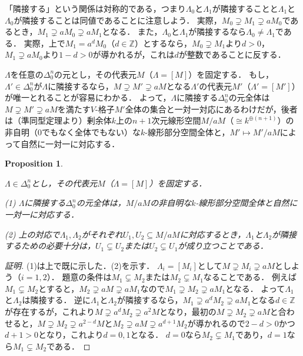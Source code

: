 \documentclass[a4paper,12pt, dvipdfmx]{jsbook}
\def\Z{\mathbb{Z}}
\theoremstyle{plain}
\newtheorem{prop}[thm]{\bfseries Proposition}
\theoremstyle{definition}
\begin{document}
「隣接する」という関係は対称的である，つまり$\Lambda_0$と$\Lambda_1$が隣接することと$\Lambda_1$と$\Lambda_0$が隣接することは同値であることに注意しよう．
実際，$M_0\supsetneq M_1\supsetneq aM_0$であるとき，$M_1\supsetneq aM_0\supsetneq aM_1$となる．
また，$\Lambda_0$と$\Lambda_1$が隣接するなら$\Lambda_0\neq\Lambda_1$である．
実際，上で$M_1=a^dM_0$（$d\in\Z$）とするなら，$M_0\supsetneq M_1$より$d>0$，$M_1\supsetneq aM_0$より$1-d>0$が導かれるが，これは$d$が整数であることに反する．

$\Lambda$を任意の$\Delta^n_0$の元とし，その代表元$M$（$\Lambda=[M]$）を固定する．
もし，$\Lambda'\in\Delta^n_0$が$\Lambda$に隣接するなら，$M\supsetneq M'\supsetneq aM$となる$\Lambda'$の代表元$M'$（$\Lambda'=[M']$）が唯一とれることが容易にわかる．
よって，$\Lambda$に隣接する$\Delta^n_0$の元全体は$M\supsetneq M'\supsetneq aM$を満たす$V$-格子$M'$全体の集合と一対一対応にあるわけだが，後者は（準同型定理より）剰余体$k$上の$n+1$次元線形空間$M/aM$（$\cong k^{\oplus (n+1)}$）の非自明（$0$でもなく全体でもない）な$k$-線形部分空間全体と，$M'\mapsto M'/aM$によって自然に一対一に対応する．
\begin{prop}\label{prop-adjacent}{\rm 
$\Lambda\in\Delta^n_0$とし，その代表元$M$（$\Lambda=[M]$）を固定する．

(1) $\Lambda$に隣接する$\Delta^n_0$の元全体は，$M/aM$の非自明な$k$-線形部分空間全体と自然に一対一に対応する．

(2) 上の対応で$\Lambda_1,\Lambda_2$がそれぞれ$U_1,U_2\subseteq M/aM$に対応するとき，$\Lambda_1$と$\Lambda_2$が隣接するための必要十分は，$U_1\subsetneq U_2$または$U_2\subsetneq U_1$が成り立つことである．}
\end{prop}

\begin{proof}[証明]
(1)は上で既に示した．(2)を示す．
$\Lambda_i=[M_i]$として$M\supsetneq M_i\supsetneq aM$としよう（$i=1,2$）．
題意の条件は$M_1\subsetneq M_2$または$M_2\subsetneq M_1$なることである．
例えば$M_1\subsetneq M_2$とすると，$M_2\supsetneq aM\supsetneq aM_1$なので$M_1\supsetneq M_2\supsetneq aM_1$となる．
よって$\Lambda_1$と$\Lambda_2$は隣接する．
逆に$\Lambda_1$と$\Lambda_2$が隣接するなら，$M_1\supsetneq a^dM_2\supsetneq aM_1$となる$d\in\Z$が存在するが，これより$M\supsetneq a^dM_2\supsetneq a^2M$となり，最初の$M\supsetneq M_2\supsetneq aM$と合わせると，$M\supsetneq M_2\supsetneq a^{2-d}M$と$M_2\supsetneq aM\supsetneq a^{d+1}M_2$が導かれるので$2-d>0$かつ$d+1>0$となり，これより$d=0,1$となる．
$d=0$なら$M_2\subsetneq M_1$であり，$d=1$なら$M_1\subsetneq M_2$である．
\end{proof}
\end{document}
